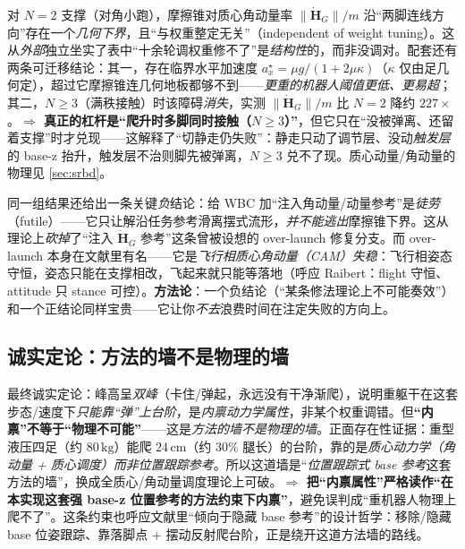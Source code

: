 \begin{insight}\label{ins:ld-angmom-bound}
对 $N=2$ 支撑（对角小跑），摩擦锥对质心角动量率 $\|\dot{\boldsymbol H}_G\|/m$ 沿“两脚连线方向”存在一个\emph{几何下界}，且“与权重整定无关”（independent of weight tuning）\cite{quad2025angmombound}。这从\emph{外部}独立坐实了表中“十余轮调权重修不了”是\emph{结构性}的，而非没调对。配套还有两条可迁移结论：其一，存在临界水平加速度 $a_x^\star=\mu g/(1+2\mu\kappa)$（$\kappa$ 仅由足几何定），超过它摩擦锥连几何地板都够不到——\emph{更重的机器人阈值更低、更易超}；其二，$N\ge 3$（满秩接触）时该障碍\emph{消失}，实测 $\|\dot{\boldsymbol H}_G\|/m$ 比 $N=2$ 降约 $227\times$。\textbf{$\Rightarrow$ 真正的杠杆是“爬升时多脚同时接触（$N\ge 3$）”}，但它只在“没被弹离、还留着支撑”时才兑现——这解释了“切静走仍失败”：静走只动了调节层、没动\emph{触发层}的 base-z 抬升，触发层不治则脚先被弹离，$N\ge 3$ 兑不了现。质心动量/角动量的物理见 \cref{sec:srbd}。
\end{insight}

\begin{insight}\label{ins:ld-angmom-futile}
同一组结果还给出一条关键\emph{负}结论：给 WBC 加“注入角动量/动量参考”是\emph{徒劳}（futile）——它只让解沿任务参考滑离摆式流形，\emph{并不能逃出}摩擦锥下界\cite{quad2025angmombound}。这从理论上\emph{砍掉}了“注入 $\dot{\boldsymbol H}_G$ 参考”这条曾被设想的 over-launch 修复分支。而 over-launch 本身在文献里有名——它是\emph{飞行相质心角动量（CAM）失稳}\cite{cam2025flight}：飞行相姿态守恒，姿态只能在支撑相改，飞起来就只能等落地（呼应 Raibert：flight 守恒、attitude 只 stance 可控）。\textbf{方法论}：一个负结论（“某条修法理论上不可能奏效”）和一个正结论同样宝贵——它让你\emph{不去}浪费时间在注定失败的方向上。
\end{insight}

\subsection{诚实定论：方法的墙不是物理的墙}
\label{subsec:ld-ol-honest}

\begin{insight}\label{ins:ld-method-wall}
最终诚实定论：峰高呈\emph{双峰}（卡住/弹起，永远没有干净渐爬），说明重躯干在这套步态/速度下\emph{只能靠“弹”上台阶}，是\emph{内禀动力学属性}，非某个权重调错。但\textbf{“内禀”不等于“物理不可能”}——这是\emph{方法的墙不是物理的墙}。正面存在性证据：重型液压四足（约 $80\,\mathrm{kg}$）能爬 $24\,\mathrm{cm}$（约 $30\%$ 腿长）的台阶，靠的是\emph{质心动力学（角动量 + 质心调度）而非位置跟踪参考}。所以这道墙是“\emph{位置跟踪式 base 参考}这套方法的墙”，换成全质心/角动量调度理论上可破。\textbf{$\Rightarrow$ 把“内禀属性”严格读作“在本实现这套强 base-z 位置参考的方法约束下内禀”}，避免误判成“重机器人物理上爬不了”。这条约束也呼应文献里“倾向于隐藏 base 参考”的设计哲学：移除/隐藏 base 位姿跟踪、靠落脚点 + 摆动反射爬台阶\cite{corberes2023stairs,jenelten2023dtc}，正是绕开这道方法墙的路线。
\end{insight}

